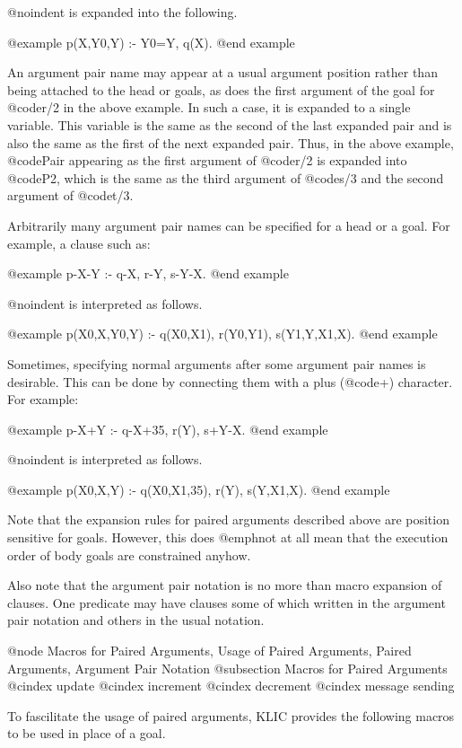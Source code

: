 @noindent
is expanded into the following.

@example
p(X,Y0,Y) :- Y0=Y, q(X).
@end example

An argument pair name may appear at a usual argument position rather
than being attached to the head or goals, as does the first argument of
the goal for @code{r/2} in the above example.  In such a case, it is
expanded to a single variable.  This variable is the same as the second
of the last expanded pair and is also the same as the first of the next
expanded pair.  Thus, in the above example, @code{Pair} appearing as the
first argument of @code{r/2} is expanded into @code{P2}, which is the
same as the third argument of @code{s/3} and the second argument of
@code{t/3}.

Arbitrarily many argument pair names can be specified for a head or a
goal.  For example, a clause such as:

@example
p-X-Y :- q-X, r-Y, s-Y-X.
@end example

@noindent
is interpreted as follows.

@example
p(X0,X,Y0,Y) :- q(X0,X1), r(Y0,Y1), s(Y1,Y,X1,X).
@end example

Sometimes, specifying normal arguments after some argument pair names is
desirable.  This can be done by connecting them with a plus (@code{+})
character.  For example:

@example
p-X+Y :- q-X+35, r(Y), s+Y-X.
@end example

@noindent
is interpreted as follows.

@example
p(X0,X,Y) :- q(X0,X1,35), r(Y), s(Y,X1,X).
@end example

Note that the expansion rules for paired arguments described above are
position sensitive for goals.  However, this does @emph{not} at all mean
that the execution order of body goals are constrained anyhow.

Also note that the argument pair notation is no more than macro
expansion of clauses.  One predicate may have clauses some of which
written in the argument pair notation and others in the usual notation.

@node Macros for Paired Arguments, Usage of Paired Arguments, Paired Arguments, Argument Pair Notation
@subsection Macros for Paired Arguments
@cindex update
@cindex increment
@cindex decrement
@cindex message sending

To fascilitate the usage of paired arguments, KLIC provides the
following macros to be used in place of a goal.


